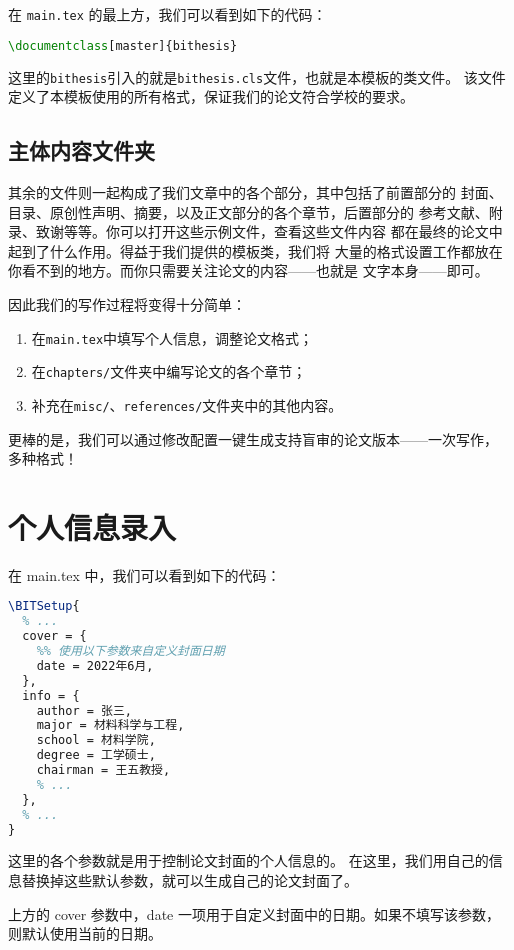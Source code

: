 在 \texttt{main.tex} 的最上方，我们可以看到如下的代码：
\begin{lstlisting}[language=TeX]
\documentclass[master]{bithesis}
\end{lstlisting}
这里的\texttt{bithesis}引入的就是\texttt{bithesis.cls}文件，也就是本模板的类文件。
该文件定义了本模板使用的所有格式，保证我们的论文符合学校的要求。

\subsection{主体内容文件夹}

其余的文件则一起构成了我们文章中的各个部分，其中包括了前置部分的
封面、目录、原创性声明、摘要，以及正文部分的各个章节，后置部分的
参考文献、附录、致谢等等。你可以打开这些示例文件，查看这些文件内容
都在最终的论文中起到了什么作用。得益于我们提供的模板类，我们将
大量的格式设置工作都放在你看不到的地方。而你只需要关注论文的内容——也就是
文字本身——即可。

因此我们的写作过程将变得十分简单：
\begin{enumerate}
  \item 在\texttt{main.tex}中填写个人信息，调整论文格式；
  \item 在\texttt{chapters/}文件夹中编写论文的各个章节；
  \item 补充在\texttt{misc/}、\texttt{references/}文件夹中的其他内容。
\end{enumerate}

更棒的是，我们可以通过修改配置一键生成支持盲审的论文版本——一次写作，
多种格式！

\section{个人信息录入}

在 main.tex 中，我们可以看到如下的代码：
\begin{lstlisting}[language=TeX]
\BITSetup{
  % ...
  cover = {
    %% 使用以下参数来自定义封面日期
    date = 2022年6月,
  },
  info = {
    author = 张三,
    major = 材料科学与工程,
    school = 材料学院,
    degree = 工学硕士,
    chairman = 王五教授,
    % ...
  },
  % ...
}
\end{lstlisting}

这里的各个参数就是用于控制论文封面的个人信息的。
在这里，我们用自己的信息替换掉这些默认参数，就可以生成自己的论文封面了。

上方的 cover 参数中，date 一项用于自定义封面中的日期。如果不填写该参数，
则默认使用当前的日期。

